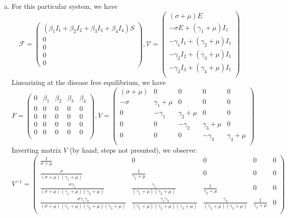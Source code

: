 \documentclass[12pt]{article}\usepackage[]{graphicx}\usepackage[]{color}
\begin{document}
\begin{enumerate}[(a)]
  \item \Rc
{\color{blue} {
For this particular system, we have
$$
\mathcal{F} = \begin{pmatrix}
(\beta_1 I_1 + \beta_2 I_2 + \beta_3 I_3 + \beta_4 I_4) S\\
0\\
0\\
0\\
0
\end{pmatrix}, \mathcal{V} = \begin{pmatrix}
(\sigma + \mu) E \\
- \sigma E + (\gamma_1 + \mu) I_1\\
- \gamma_1 I_1 + (\gamma_2 + \mu) I_1\\
- \gamma_2 I_2 + (\gamma_3 + \mu) I_1\\
- \gamma_3 I_3 + (\gamma_4 + \mu) I_1\\
\end{pmatrix}
$$
Linearizing at the disease free equilibrium, we have
$$
F = \begin{pmatrix}
0 & \beta_1 & \beta_2 & \beta_3 & \beta_4\\
0 & 0 & 0 & 0 & 0\\
0 & 0 & 0 & 0 & 0\\
0 & 0 & 0 & 0 & 0\\
0 & 0 & 0 & 0 & 0\\
\end{pmatrix},
V = \begin{pmatrix}
(\sigma + \mu) & 0 & 0 & 0 & 0\\
- \sigma & \gamma_1 + \mu & 0 & 0 & 0\\
0 & - \gamma_1 & \gamma_2 + \mu & 0 & 0\\
0 & 0 & - \gamma_2 & \gamma_3 + \mu & 0\\
0 & 0 & 0 & - \gamma_3 & \gamma_4 + \mu\\
\end{pmatrix}
$$
Inverting matrix $V$ (by hand; steps not presnted), we observe:
$$
V^{-1} = \begin{pmatrix}
\frac{1}{\sigma + \mu} & 0 & 0 & 0 & 0\\
\frac{\sigma}{(\sigma + \mu)(\gamma_1 + \mu)} & \frac{1}{\gamma_1 + \mu} & 0 & 0 & 0\\
\frac{\sigma \gamma_1}{(\sigma + \mu)(\gamma_1 + \mu)(\gamma_2 + \mu)} & \frac{\gamma_1}{(\gamma_1 + \mu)(\gamma_2 + \mu)} & \frac{1}{\gamma_2 + \mu} & 0 & 0\\
\frac{\sigma \gamma_1 \gamma_2}{(\sigma + \mu)(\gamma_1 + \mu)(\gamma_2 + \mu)(\gamma_3 + \mu)} & \frac{\gamma_1 \gamma_2}{(\gamma_1 + \mu)(\gamma_2 + \mu)(\gamma_3 + \mu)} & \frac{\gamma_2}{(\gamma_2 + \mu)(\gamma_3 + \mu)} & \frac{1}{\gamma_3 + \mu} & 0\\

\end{pmatrix}$$}}
\end{enumerate}
\end{document}
